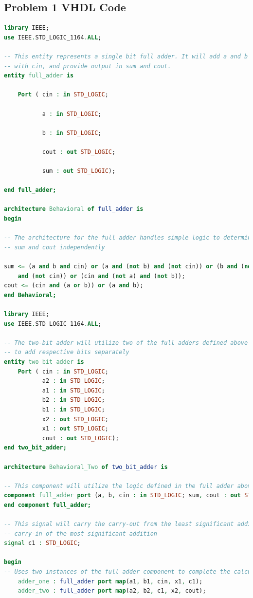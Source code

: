\documentclass[11pt]{article}
\begin{document}
\begin{appendices}

\section{Problem 1 VHDL Code}

\begin{lstlisting}[language=VHDL]
library IEEE;
use IEEE.STD_LOGIC_1164.ALL;

-- This entity represents a single bit full adder. It will add a and b along 
-- with cin, and provide output in sum and cout.
entity full_adder is

    Port ( cin : in STD_LOGIC;

           a : in STD_LOGIC;

           b : in STD_LOGIC;

           cout : out STD_LOGIC;

           sum : out STD_LOGIC);

end full_adder;

architecture Behavioral of full_adder is
begin

-- The architecture for the full adder handles simple logic to determine 
-- sum and cout independently

sum <= (a and b and cin) or (a and (not b) and (not cin)) or (b and (not a) 
	and (not cin)) or (cin and (not a) and (not b));
cout <= (cin and (a or b)) or (a and b);
end Behavioral;

library IEEE;
use IEEE.STD_LOGIC_1164.ALL;

-- The two-bit adder will utilize two of the full adders defined above
-- to add respective bits separately
entity two_bit_adder is
    Port ( cin : in STD_LOGIC;
           a2 : in STD_LOGIC;
           a1 : in STD_LOGIC;
           b2 : in STD_LOGIC;
           b1 : in STD_LOGIC;
           x2 : out STD_LOGIC;
           x1 : out STD_LOGIC;
           cout : out STD_LOGIC);
end two_bit_adder;

architecture Behavioral_Two of two_bit_adder is

-- This component will utilize the logic defined in the full adder above
component full_adder port (a, b, cin : in STD_LOGIC; sum, cout : out STD_LOGIC);
end component full_adder;

-- This signal will carry the carry-out from the least significant addition to the 
-- carry-in of the most significant addition
signal c1 : STD_LOGIC;

begin
-- Uses two instances of the full adder component to complete the calculation
    adder_one : full_adder port map(a1, b1, cin, x1, c1);
    adder_two : full_adder port map(a2, b2, c1, x2, cout);


\end{lstlisting}
\end{appendices}
\end{document}
